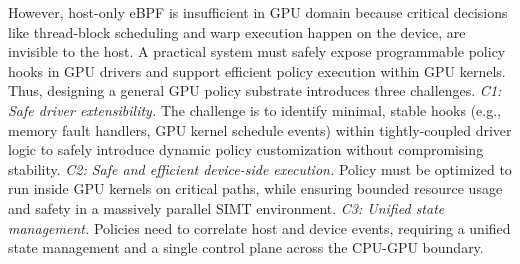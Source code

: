 However, host-only eBPF is insufficient in GPU domain because critical decisions like thread-block scheduling and warp execution happen on the device, are invisible to the host. 
A practical system must safely expose programmable policy hooks in GPU drivers and support efficient policy execution within GPU kernels. 
Thus, designing a general GPU policy substrate introduces three challenges.
\emph{C1: Safe driver extensibility.} The challenge is to identify minimal, stable hooks (e.g., memory fault handlers, GPU kernel schedule events) within tightly-coupled driver logic to safely introduce dynamic policy customization without compromising stability. \emph{C2: Safe and efficient device-side execution.} Policy must be optimized to run inside GPU kernels on critical paths, while ensuring bounded resource usage and safety in a massively parallel SIMT environment. \emph{C3: Unified state management.} Policies need to correlate host and device events, requiring a unified state management and a single control plane across the CPU-GPU boundary.

